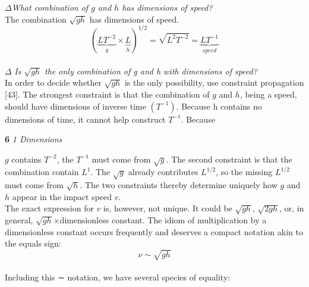 \documentclass[a4paper]{article}
\numberwithin{equation}{section}
\begin{document}
$\Delta$\textit {What combination of $g$ and $h$ has dimensions of speed?}
\\

The combination $\sqrt{gh}$ has dimensions of speed.
\\

\begin{equation}
(\underbrace{LT^{−2}}_{g}\times \underbrace{L}_{h})^{1/2}=\sqrt{L^2T^{-2}}=\underbrace{LT^{-1}}_{speed}
\end{equation}
\\

$\Delta$ \textit {Is $\sqrt{gh}$ the only combination of g and h with dimensions of speed?}
\\

{\large In order to decide whether $\sqrt{gh}$ is the only possibility, use constraint
propagation [43]. The strongest constraint is that the combination of $g$ and
$h$, being a speed, should have dimensions of inverse time $(T^{−1})$. Because
h contains no dimensions of time, it cannot help construct $T^{−1}$. Because}


\newpage
 \large\textbf{6} \hfill \textit{1 Dimensions} \\ 
\vspace{0pt} 

$g$ contains $T^{−2}$, the $T^{−1}$ must come from $\sqrt{g}$. The second constraint is
that the combination contain $L^{1}$. The $\sqrt{g}$ already contributes $L^{1/2}$, so the
missing $L^{1/2}$ must come from $\sqrt{h}$. The two constraints thereby determine
uniquely how $g$ and $h$ appear in the impact speed $v$.
\\

The exact expression for $v$ is, however, not unique. It could be $\sqrt{gh}$,
$\sqrt{2gh}$,
or, in general, $\sqrt{gh}$×dimensionless constant. The idiom of multiplication
by a dimensionless constant occurs frequently and deserves a compact
notation akin to the equals sign:
\\

\begin{equation}
\nu \sim \sqrt{gh} 
\end{equation}
\\

Including this ∼ notation, we have several species of equality:
\\
\end{document}
